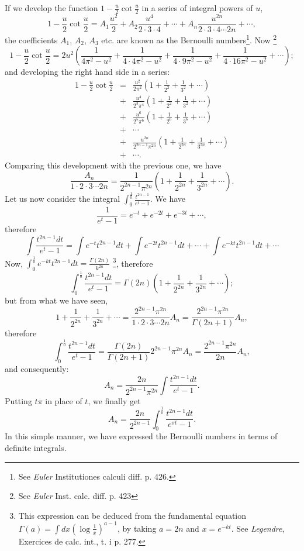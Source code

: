 \documentclass[12pt]{article}
\begin{document}
If we develop the function $1 - \frac{u}{2} \cot \frac{u}{2}$ in a series of integral powers of $u$, 
\[ 1 - \frac{u}{2} \cot \frac{u}{2} = A_1 \frac{u^2}{2} + A_2 \frac{u^4}{2 \cdot 3 \cdot 4} + \cdots + A_n \frac{u^{2n}}{2\cdot 3 \cdot 4 \cdots 2n} + \cdots, \]
the coefficients $A_1$, $A_2$, $A_3$ etc. are known as the Bernoulli numbers\footnote{ See \emph{Euler} Institutiones calculi diff. p. 426.}. Now \footnote{See \emph{Euler} Inst. calc. diff. p. 423} 
\[ 1 - \frac{u}{2} \cot \frac{u}{2} = 2u^2 \left(\frac{1}{4\pi^2-u^2} + \frac{1}{4\cdot 4\pi^2 - u^2} + \frac{1}{4 \cdot 9\pi^2 - u^2} + \frac{1}{4 \cdot 16\pi^2 - u^2} + \cdots \right); \]
and developing the right hand side in a series:
\begin{eqnarray*} 1 - \frac{u}{2} \cot \frac{u}{2} &=& \frac{u^2}{2\pi^2} \left(1 + \frac{1}{2^2} + \frac{1}{3^2} + \cdots \right) \\
& + & \frac{u^4}{2^3\pi^4} \left(1 + \frac{1}{2^2} + \frac{1}{3^2} + \cdots \right) \\
& + & \frac{u^6}{2^5\pi^6} \left(1 + \frac{1}{2^6} + \frac{1}{3^6} + \cdots \right) \\
& + & \cdots \\
& + & \frac{ u^{2n} }{ 2^{2n-1} \pi^{2n} } \left(1 + \frac{1}{2^{2n}} + \frac{1}{3^{2n}} + \cdots \right)\\
& + & \cdots . \end{eqnarray*}
Comparing this development with the previous one, we have
\[ \frac{A_n}{1 \cdot 2 \cdot 3 \cdots 2n} = \frac{1}{2^{2n-1}\pi^{2n}} \left( 1 + \frac{1}{2^{2n}} + \frac{1}{3^{2n}} + \cdots \right) . \]
Let us now consider the integral $\int_0^\frac{1}{0} \frac{t^{2n-1}}{e^t-1}$. We have
\[ \frac{1}{e^t -1} = e^{-t} + e^{-2t} + e^{-3t} + \cdots , \]
therefore
\[ \int \frac{t^{2n-1} dt}{e^t-1} = \int e^{-t} t^{2n-1} dt + \int e^{-2t} t^{2n-1} dt + \cdots + \int e^{-kt} t^{2n-1}dt + \cdots  \]
Now, $\int_0^{\frac{1}{0}} e^{-kt} t^{2n-1} dt = \frac{\Gamma(2n)}{k^{2n}}$ \footnote{This expression can be deduced from the fundamental equation $\Gamma(a) = \int dx \left(\log \frac{1}{x} \right)^{a-1}$, by taking $a = 2n$ and $x = e^{-kt}$.  See \emph{Legendre}, Exercices de calc. int., t. i p. 277.}, therefore
\[ \int_0^{\frac{1}{0}} \frac{t^{2n-1}dt}{e^t-1} = \Gamma(2n)\left(1 + \frac{1}{2^{2n}} + \frac{1}{3^{2n}} + \cdots \right) ; \]
but from what we have seen, 
\[ 1 + \frac{1}{2^{2n}} + \frac{1}{3^{2n}} + \cdots = \frac{2^{2n-1} \pi^{2n}}{1 \cdot 2 \cdot 3 \cdots 2n} A_n = \frac{2^{2n-1}\pi^{2n}}{\Gamma(2n+1)} A_n, \]
therefore
\[ \int_0^{\frac{1}{0}} \frac{t^{2n-1}dt}{e^t-1} = \frac{\Gamma(2n)}{\Gamma(2n+1)} 2^{2n-1} \pi^{2n} A_n = \frac{2^{2n-1}\pi^{2n}}{2n} A_n, \]
and consequently:
\[A_n = \frac{2n}{2^{2n-1} \pi^{2n}} \int \frac{t^{2n-1}dt}{e^t-1} .\]
Putting $t\pi$ in place of $t$, we finally get
\[ A_n = \frac{2n}{2^{2n-1}} \int_0^{\frac{1}{0}} \frac{t^{2n-1} dt}{e^{\pi t} - 1} . \]
In this simple manner, we have expressed the Bernoulli numbers in terms of definite integrals.
\end{document}

